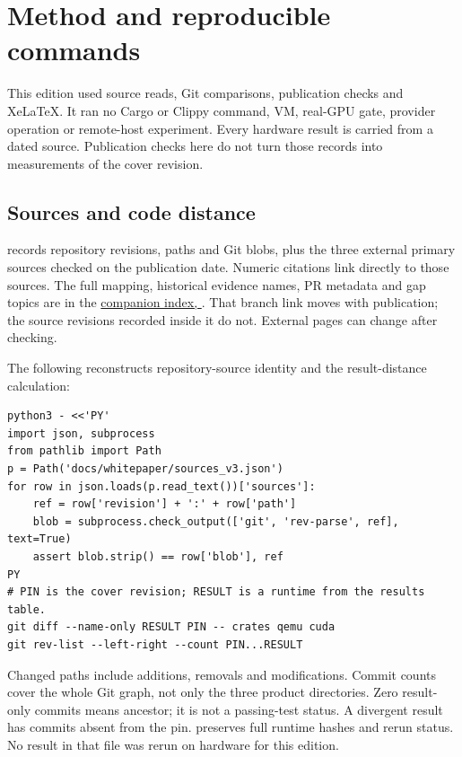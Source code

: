 \section{Method and reproducible commands}

This edition used source reads, Git comparisons, publication checks and XeLaTeX. It ran no
Cargo or Clippy command, VM, real-GPU gate, provider operation or remote-host experiment.
Every hardware result is carried from a dated source. Publication checks here do not turn
those records into measurements of the cover revision.

\subsection{Sources and code distance}

 records repository revisions, paths and Git blobs, plus the three
external primary sources checked on the publication date. Numeric citations link directly
to those sources. The full mapping, historical evidence names, PR metadata and gap topics are
in the \href{\repobase/blob/codex/whitepaper-v3-20261027/docs/whitepaper/kayfabe_v3_index.md}
{companion index, }. That branch link moves with publication;
the source revisions recorded inside it do not. External pages can change after checking.

The following reconstructs repository-source identity and the result-distance calculation:
\begin{verbatim}
python3 - <<'PY'
import json, subprocess
from pathlib import Path
p = Path('docs/whitepaper/sources_v3.json')
for row in json.loads(p.read_text())['sources']:
    ref = row['revision'] + ':' + row['path']
    blob = subprocess.check_output(['git', 'rev-parse', ref], text=True)
    assert blob.strip() == row['blob'], ref
PY
# PIN is the cover revision; RESULT is a runtime from the results table.
git diff --name-only RESULT PIN -- crates qemu cuda
git rev-list --left-right --count PIN...RESULT
\end{verbatim}

Changed paths include additions, removals and modifications. Commit counts cover the whole
Git graph, not only the three product directories. Zero result-only commits means ancestor;
it is not a passing-test status. A divergent result has commits absent from the pin.
 preserves full runtime hashes and rerun status. No result in
that file was rerun on hardware for this edition.

